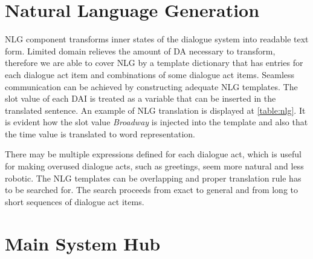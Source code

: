 \section{Natural Language Generation}

\acf{NLG} component transforms inner states of the dialogue system into readable text form.
Limited domain relieves the amount of \ac{DA} necessary to transform, therefore we are able to cover \ac{NLG} by a template dictionary that has entries for each dialogue act item and combinations of some dialogue act items.
Seamless communication can be achieved by constructing adequate \ac{NLG} templates.
The slot value of each \ac{DAI} is treated as a variable that can be inserted in the translated sentence.
An example of \ac{NLG} translation is displayed at \ref{table:nlg}.
It is evident how the slot value \textit{Broadway} is injected into the template and also that the time value is translated to word representation.

\begin{table}[h]
\centering
\small
\hspace*{-3pt}
\caption[\ac{NLG} conversion of \ac{DA} to sentence]{Translation example of dialogue act to sentence by Natural Language Generation component}
\label{table:nlg}
\end{table}

There may be multiple expressions defined for each dialogue act, which is useful for making overused dialogue acts, such as greetings, seem more natural and less robotic.
The \ac{NLG} templates can be overlapping and proper translation rule has to be searched for.
The search proceeds from exact to general and from long to short sequences of dialogue act items.

\section{Main System Hub}

